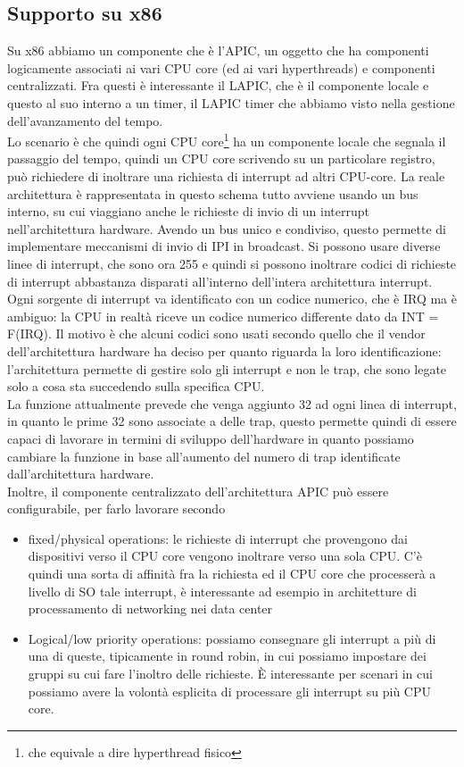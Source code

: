 \documentclass[12pt, oneside]{extbook}
\begin{document}
\subsection{Supporto su x86}
Su x86 abbiamo un componente che è l'APIC, un oggetto che ha componenti logicamente associati ai vari CPU core (ed ai vari hyperthreads) e componenti centralizzati. Fra questi è interessante il LAPIC, che è il componente locale e questo al suo interno a un timer, il LAPIC timer che abbiamo visto nella gestione dell'avanzamento del tempo.\\Lo scenario è che quindi ogni CPU core\footnote{che equivale a dire hyperthread fisico} ha un componente locale che segnala il passaggio del tempo, quindi un CPU core scrivendo su un particolare registro, può richiedere di inoltrare una richiesta di interrupt ad altri CPU-core. La reale architettura è rappresentata in questo schema
tutto avviene usando un bus interno, su cui viaggiano anche le richieste di invio di un interrupt nell'architettura hardware. Avendo un bus unico e condiviso, questo permette di implementare meccanismi di invio di IPI in broadcast. Si possono usare diverse linee di interrupt, che sono ora 255 e quindi si possono inoltrare codici di richieste di interrupt abbastanza disparati all'interno dell'intera architettura interrupt.\\Ogni sorgente di interrupt va identificato con un codice numerico, che è IRQ ma è ambiguo: la CPU in realtà riceve un codice numerico differente dato da INT = F(IRQ). Il motivo è che alcuni codici sono usati secondo quello che il vendor dell'architettura hardware ha deciso per quanto riguarda la loro identificazione: l'architettura permette di gestire solo gli interrupt e non le trap, che sono legate solo a cosa sta succedendo sulla specifica CPU.\\La funzione attualmente prevede che venga aggiunto 32 ad ogni linea di interrupt, in quanto le prime 32 sono associate a delle trap, questo permette quindi di essere capaci di lavorare in termini di sviluppo dell'hardware in quanto possiamo cambiare la funzione in base all'aumento del numero di trap identificate dall'architettura hardware.\\Inoltre, il componente centralizzato dell'architettura APIC può essere configurabile, per farlo lavorare secondo
\begin{itemize}
\item fixed/physical operations: le richieste di interrupt che provengono dai dispositivi verso il CPU core vengono inoltrare verso una sola CPU. C'è quindi una sorta di affinità fra la richiesta ed il CPU core che processerà a livello di SO tale interrupt, è interessante ad esempio in architetture di processamento di networking nei data center
\item Logical/low priority operations: possiamo consegnare gli interrupt a più di una di queste, tipicamente in round robin, in cui possiamo impostare dei gruppi su cui fare l'inoltro delle richieste. È interessante per scenari in cui possiamo avere la volontà esplicita di processare gli interrupt su più CPU core.
\end{itemize}
\end{document}
